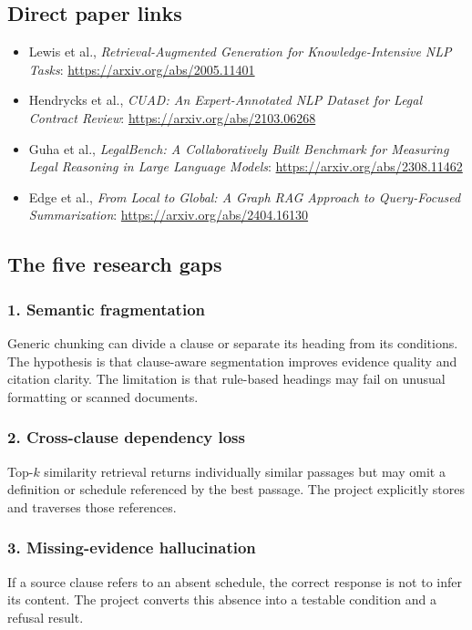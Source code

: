 \documentclass[11pt,letterpaper]{article}
\begin{document}
\subsection{Direct paper links}
\begin{itemize}
  \item Lewis et al., \textit{Retrieval-Augmented Generation for Knowledge-Intensive NLP Tasks}: \url{https://arxiv.org/abs/2005.11401}
  \item Hendrycks et al., \textit{CUAD: An Expert-Annotated NLP Dataset for Legal Contract Review}: \url{https://arxiv.org/abs/2103.06268}
  \item Guha et al., \textit{LegalBench: A Collaboratively Built Benchmark for Measuring Legal Reasoning in Large Language Models}: \url{https://arxiv.org/abs/2308.11462}
  \item Edge et al., \textit{From Local to Global: A Graph RAG Approach to Query-Focused Summarization}: \url{https://arxiv.org/abs/2404.16130}
\end{itemize}

\newpage
\subsection{The five research gaps}
\subsubsection{1. Semantic fragmentation}
Generic chunking can divide a clause or separate its heading from its conditions. The hypothesis is that clause-aware segmentation improves evidence quality and citation clarity. The limitation is that rule-based headings may fail on unusual formatting or scanned documents.

\subsubsection{2. Cross-clause dependency loss}
Top-$k$ similarity retrieval returns individually similar passages but may omit a definition or schedule referenced by the best passage. The project explicitly stores and traverses those references.

\subsubsection{3. Missing-evidence hallucination}
If a source clause refers to an absent schedule, the correct response is not to infer its content. The project converts this absence into a testable condition and a refusal result.
\end{document}
